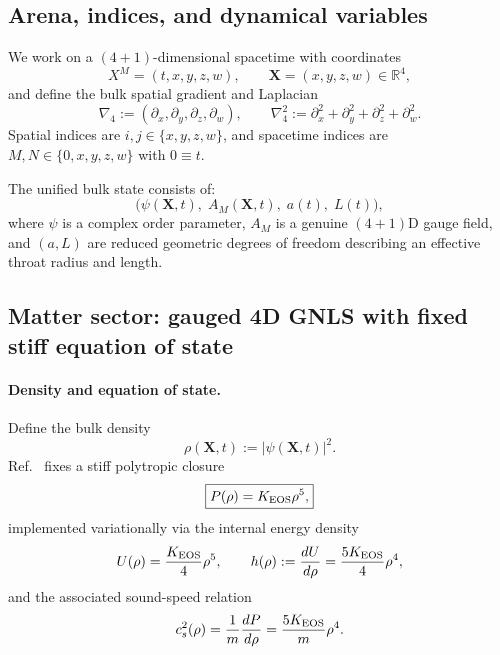 \documentclass[11pt]{article}
\begin{document}
\subsection{Arena, indices, and dynamical variables}
\label{sec:recap_arena}

We work on a $(4+1)$-dimensional spacetime with coordinates
\begin{equation}
X^M = (t, x, y, z, w),\qquad \mathbf{X}=(x,y,z,w)\in\mathbb{R}^4,
\end{equation}
and define the bulk spatial gradient and Laplacian
\begin{equation}
\nabla_4 := (\partial_x,\partial_y,\partial_z,\partial_w),\qquad
\nabla_4^2 := \partial_x^2+\partial_y^2+\partial_z^2+\partial_w^2.
\end{equation}
Spatial indices are $i,j\in\{x,y,z,w\}$, and spacetime indices are $M,N\in\{0,x,y,z,w\}$ with $0\equiv t$.

The unified bulk state consists of:
\begin{equation}
\boxed{
\big(\psi(\mathbf{X},t),\; A_M(\mathbf{X},t),\; a(t),\; L(t)\big),
}
\end{equation}
where $\psi$ is a complex order parameter, $A_M$ is a genuine $(4+1)$D gauge field,
and $(a,L)$ are reduced geometric degrees of freedom describing an effective throat radius and length.

\subsection{Matter sector: gauged 4D GNLS with fixed stiff equation of state}
\label{sec:recap_matter}

\paragraph{Density and equation of state.}
Define the bulk density
\begin{equation}
\rho(\mathbf{X},t) := |\psi(\mathbf{X},t)|^2.
\end{equation}
Ref.~\cite{norris2026_4d_model} fixes a stiff polytropic closure
\begin{equation}
\boxed{
P(\rho)=K_{\rm EOS}\rho^{5},
}
\label{eq:recap_eos}
\end{equation}
implemented variationally via the internal energy density
\begin{equation}
U(\rho)=\frac{K_{\rm EOS}}{4}\rho^{5},
\qquad
h(\rho):=\frac{dU}{d\rho}=\frac{5K_{\rm EOS}}{4}\rho^{4},
\label{eq:recap_thermo_ladder}
\end{equation}
and the associated sound-speed relation
\begin{equation}
c_s^2(\rho)=\frac{1}{m}\frac{dP}{d\rho}=\frac{5K_{\rm EOS}}{m}\rho^{4}.
\label{eq:recap_cs2}
\end{equation}
\end{document}
